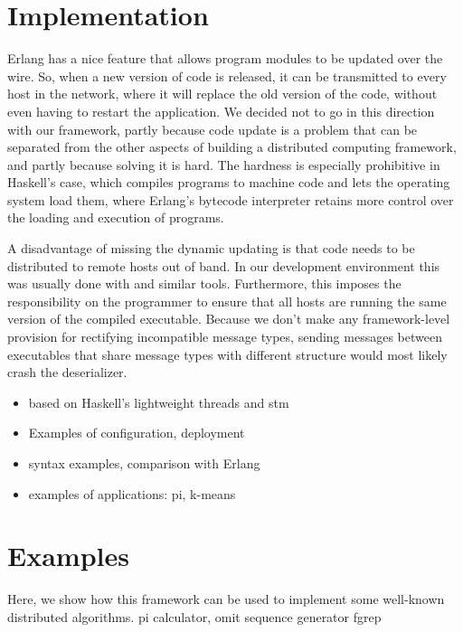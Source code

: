 \documentclass[preprint]{sigplanconf}
\begin{document}
\section{Implementation}
Erlang has a nice feature that allows program modules to be updated over the wire. So, when a new version of code is released, it can be transmitted to every host in the network, where it will replace the old version of the code, without even having to restart the application. We decided not to go in this direction with our framework, partly because code update is a problem that can be separated from the other aspects of building a distributed computing framework, and partly because solving it is hard. The hardness is especially prohibitive in Haskell's case, which compiles programs to machine code and lets the operating system load them, where Erlang's bytecode interpreter retains more control over the loading and execution of programs.

A disadvantage of missing the dynamic updating is that code needs to be distributed to remote hosts out of band. In our development environment this was usually done with  and similar tools. Furthermore, this imposes the responsibility on the programmer to ensure that all hosts are running the same version of the compiled executable. Because we don't make any framework-level provision for rectifying incompatible message types, sending messages between executables that share message types with different structure would most likely crash the deserializer.

\begin{itemize}
\item based on Haskell's lightweight threads  and stm
\item Examples of configuration, deployment
\item syntax examples, comparison with Erlang
\item examples of applications: pi, k-means
\end{itemize}


\section{Examples}
Here, we show how this framework can be used to implement some well-known distributed algorithms.
pi calculator, omit sequence generator
fgrep
\end{document}
